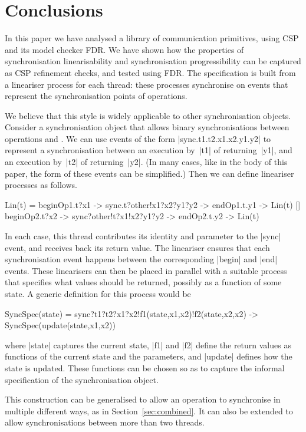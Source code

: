 \section{Conclusions}
\label{sec:conc}

In this paper we have analysed a library of communication primitives, using
CSP and its model checker FDR\@.  We have shown how the properties of
synchronisation linearisability and synchronisation progressibility can be
captured as CSP refinement checks, and tested using FDR.  The specification is
built from a lineariser process for each thread: these processes synchronise
on events that represent the synchronisation points of operations.  

We believe that this style is widely applicable to other synchronisation
objects.  Consider a synchronisation object that allows binary
synchronisations between operations  and .  We can use
events of the form |sync.t1.t2.x1.x2.y1.y2| to represent a synchronisation
between an execution by~|t1| of  returning~|y1|, and an
execution by~|t2| of  returning~|y2|.  (In many cases, like in
the body of this paper, the form of these events can be simplified.)  Then we
can define lineariser processes as follows.
%
\begin{cspm}
Lin(t) = 
  beginOp1.t?x1 -> sync.t?other!x1?x2?y1?y2 -> endOp1.t.y1 -> Lin(t) 
  [] beginOp2.t?x2 -> sync?other!t?x1!x2?y1?y2 -> endOp2.t.y2 -> Lin(t)
\end{cspm}
%
In each case, this thread contributes its identity and parameter to the |sync|
event, and receives back its return value.  The lineariser ensures that each
synchronisation event happens between the corresponding |begin| and |end|
events.  These linearisers can then be placed in parallel with a suitable
process that specifies what values should be returned, possibly as a function
of some state.  A generic definition for this process would be
%
\begin{cspm}
SyncSpec(state) = 
  sync?t1?t2?x1?x2!f1(state,x1,x2)!f2(state,x2,x2) -> SyncSpec(update(state,x1,x2))
\end{cspm}
%
where |state| captures the current state, |f1| and |f2| define the return
values as functions of the current state and the parameters, and |update|
defines how the state is updated.  These functions can be chosen so as to
capture the informal specification of the synchronisation object.

This construction can be generalised to allow an operation to synchronise in
multiple different ways, as in Section~\ref{sec:combined}.  It can also be
extended to allow synchronisations between more than two threads.

